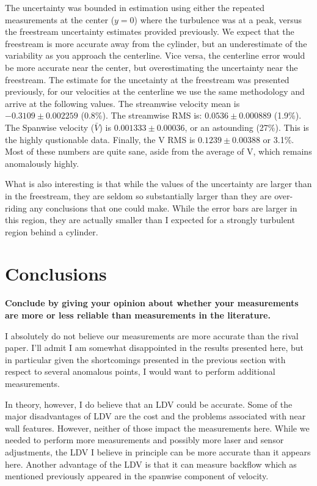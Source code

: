 \documentclass{article}
\begin{document}
The uncertainty was bounded in estimation using either the repeated
measurements at the center ($y=0$) where the turbulence was at a peak,
versus the freestream uncertainty estimates provided previously. We
expect that the freestream is more accurate away from the cylinder, but
an underestimate of the variability as you approach the centerline. Vice
versa, the centerline error would be more accurate near the center, but
overestimating the uncertainty near the freestream. The estimate for the 
uncetainty at the freestream was presented previously, for our velocities at the centerline we
use the same methodology and arrive at the following values.
The streamwise velocity mean is $-0.3109 \pm 0.002259$ (0.8\%). The streamwise RMS is:
$0.0536 \pm 0.000889$ (1.9\%). The Spanwise velocity ($\bar V$) is $0.001333 \pm 0.00036$, 
or an astounding (27\%). This is the highly qustionable data. Finally, the V RMS is $0.1239 \pm 0.00388$ or 3.1\%.
Most of these numbers are quite sane, aside from the average of V, which remains anomalously highly. 

What is also interesting is that while the values of the uncertainty are larger than in the freestream, they are seldom 
so substantially larger than they are over-riding any conclusions that one could make. While the error bars are 
larger in this region, they are actually smaller than I expected for a strongly turbulent region behind a cylinder. 

\section{Conclusions}

\textbf{Conclude by giving your opinion about whether your measurements
are more or less reliable than measurements in the literature.} 

I absolutely do not believe our measurements are more accurate than the
rival paper. I'll admit I am somewhat disappointed in the results
presented here, but in particular given the shortcomings presented in
the previous section with respect to several anomalous points, I would
want to perform additional measurements. 

In theory, however, I do believe that an LDV could be accurate. Some of
the major disadvantages of LDV are the cost and the problems associated
with near wall features. However, neither of those impact the
measurements here. While we needed to perform more measurements and
possibly more laser and sensor adjustments, the LDV I believe in
principle can be more accurate than it appears here. Another
advantage of the LDV is that it can measure backflow which as mentioned
previously appeared in the spanwise component of velocity. 



%
%
%
\end{document}
